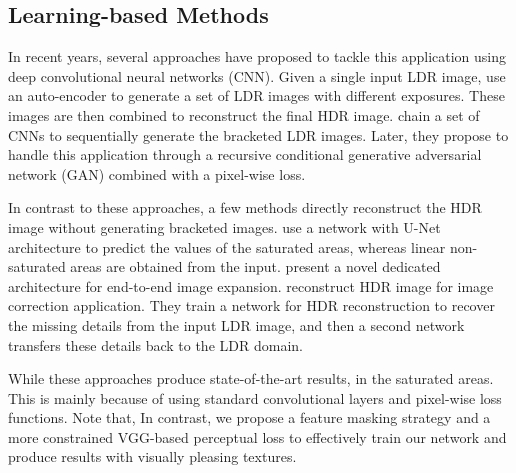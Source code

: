\subsection{Learning-based Methods}

In recent years, several approaches have proposed to tackle this application using deep convolutional neural networks (CNN). Given a single input LDR image, \citet{endo2017deep} use an auto-encoder \cite{hinton2006reducing} to generate a set of LDR images with different exposures. These images are then combined to reconstruct the final HDR image. \citet{lee2018deep} chain a set of CNNs to sequentially generate the bracketed LDR images. Later, they propose \cite{alee2018deep} to handle this application through a recursive conditional generative adversarial network (GAN) \cite{goodfellow2014generative} combined with a pixel-wise  loss.

In contrast to these approaches, a few methods \cite{eilertsen2017hdr, yang2018image, marnerides2018expandnet} directly reconstruct the HDR image without generating bracketed images. \citet{eilertsen2017hdr} use a network with U-Net architecture to predict the values of the saturated areas, whereas linear non-saturated areas are obtained from the input. \citet{marnerides2018expandnet} present a novel dedicated architecture for end-to-end image expansion. \citet{yang2018image} reconstruct HDR image for image correction application. They train a network for HDR reconstruction to recover the missing details from the input LDR image, and then a second network transfers these details back to the LDR domain.

While these approaches produce state-of-the-art results,  in the saturated areas. This is mainly because of using standard convolutional layers and pixel-wise loss functions. Note that,  In contrast, we propose a feature masking strategy and a more constrained VGG-based perceptual loss to effectively train our network and produce results with visually pleasing textures.
























